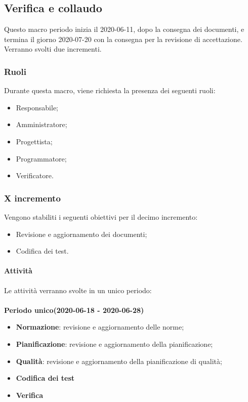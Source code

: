 \documentclass[../piano-di-progetto.tex]{subfiles}
\begin{document}
\subsection{Verifica e collaudo}
Questo macro periodo inizia il 2020-06-11, dopo la consegna dei documenti, e termina il giorno 2020-07-20 con la consegna per la revisione di accettazione. Verranno svolti due incrementi.

\subsubsection{Ruoli}
Durante questa macro, viene richiesta la presenza dei seguenti ruoli:
\begin{itemize}
    \item Responsabile;
    \item Amministratore;
    \item Progettista;
    \item Programmatore;
    \item Verificatore.
\end{itemize}

\subsubsection{X incremento}
 Vengono stabiliti i seguenti obiettivi per il decimo incremento:
 \begin{itemize}
     \item Revisione e aggiornamento dei documenti;
     \item Codifica dei test.
 \end{itemize}

\paragraph{Attività}
Le attività verranno svolte in un unico periodo:
\\
\\
\textbf{Periodo unico(2020-06-18 - 2020-06-28)}
\begin{itemize}
        \item \textbf{Normazione}: revisione e aggiornamento delle norme;
        \item \textbf{Pianificazione}: revisione e aggiornamento della pianificazione;
        \item \textbf{Qualità}: revisione e aggiornamento della pianificazione di qualità;
        \item \textbf{Codifica dei test}
        \item \textbf{Verifica}
\end{itemize}
\end{document}
